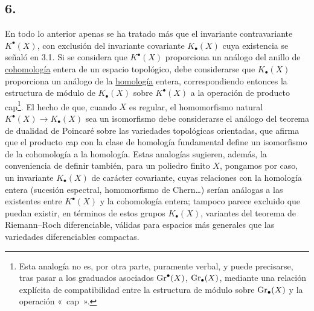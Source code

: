 \subsection*{6.}
En todo lo anterior apenas se ha tratado más que el invariante contravariante
$K^\bullet(X)$, con exclusión del invariante covariante $K_\bullet(X)$ cuya
existencia se señaló en 3.1. Si se considera que $K^\bullet(X)$ proporciona
un análogo del anillo de \underline{cohomología} entera de un espacio
topológico, debe considerarse que $K_\bullet(X)$ proporciona un análogo de la
\underline{homología} entera, correspondiendo entonces la estructura de
módulo de $K_\bullet(X)$ sobre $K^\bullet(X)$ a la operación de producto
cap\footnote{Esta analogía no es, por otra parte, puramente verbal, y puede
precisarse, tras pasar a los graduados asociados $\operatorname{Gr}^\bullet(X)$,
$\operatorname{Gr}_\bullet(X)$, mediante una relación explícita de compatibilidad entre la
estructura de módulo sobre $\operatorname{Gr}_\bullet(X)$ y la operación «~cap~».}. El
hecho de que, cuando $X$ es regular, el homomorfismo natural
$K^\bullet(X)\to K_\bullet(X)$ sea un isomorfismo debe considerarse el
análogo del teorema de dualidad de Poincaré sobre las variedades topológicas
orientadas, que afirma que el producto cap con la clase de homología
fundamental define un isomorfismo de la cohomología a la homología. Estas
analogías sugieren, además, la conveniencia de definir también, para un
poliedro finito $X$, pongamos por caso, un invariante $K_\bullet(X)$ de
carácter covariante, cuyas relaciones con la homología entera (sucesión
espectral, homomorfismo de Chern\dots) serían análogas a las existentes entre
$K^\bullet(X)$ y la cohomología entera; tampoco parece excluido que puedan
existir, en términos de estos grupos $K_\bullet(X)$, variantes del teorema de
Riemann--Roch diferenciable, válidas para espacios más generales que las
variedades diferenciables compactas.

